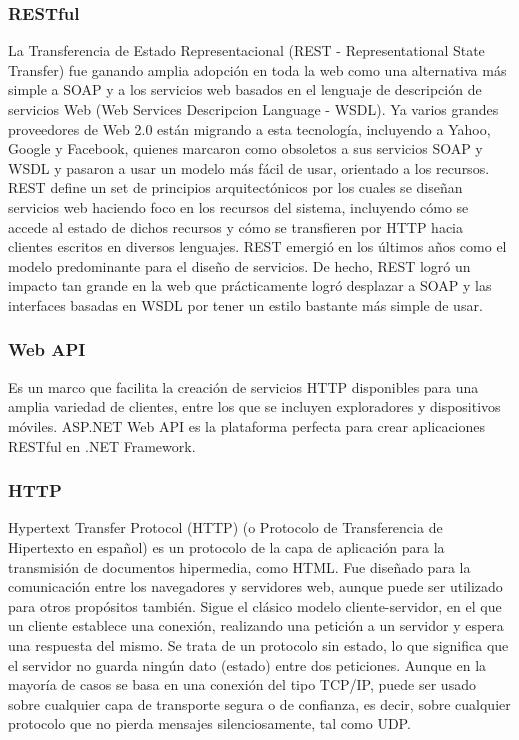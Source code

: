 	
		\subsubsection{RESTful}
		
		{La Transferencia de Estado Representacional (REST - Representational State Transfer) fue ganando amplia adopción en toda la web como una alternativa más simple a SOAP y a los servicios web basados en el lenguaje de descripción de servicios Web (Web Services Descripcion Language - WSDL). Ya varios grandes proveedores de Web 2.0 están migrando a esta tecnología, incluyendo a Yahoo, Google y Facebook, quienes marcaron como obsoletos a sus servicios SOAP y WSDL y pasaron a usar un modelo más fácil de usar, orientado a los recursos.\\
			
		REST define un set de principios arquitectónicos por los cuales se diseñan servicios web haciendo foco en los recursos del sistema, incluyendo cómo se accede al estado de dichos recursos y cómo se transfieren por HTTP hacia clientes escritos en diversos lenguajes. REST emergió en los últimos años como el modelo predominante para el diseño de servicios. De hecho, REST logró un impacto tan grande en la web que prácticamente logró desplazar a SOAP y las interfaces basadas en WSDL por tener un estilo bastante más simple de usar.}
	
	
		\subsubsection{Web API}
		
		{Es un marco que facilita la creación de servicios HTTP disponibles para una amplia variedad de clientes, entre los que se incluyen exploradores y dispositivos móviles. ASP.NET Web API es la plataforma perfecta para crear aplicaciones RESTful en .NET Framework.}
		
		
		\subsubsection{HTTP}
		
		{Hypertext Transfer Protocol (HTTP) (o Protocolo de Transferencia de Hipertexto en español) es un protocolo de la capa de aplicación para la transmisión de documentos hipermedia, como HTML. Fue diseñado para la comunicación entre los navegadores y servidores web, aunque puede ser utilizado para otros propósitos también. Sigue el clásico modelo cliente-servidor, en el que un cliente establece una conexión, realizando una petición a un servidor y espera una respuesta del mismo. Se trata de un protocolo sin estado, lo que significa que el servidor no guarda ningún dato (estado) entre dos peticiones. Aunque en la mayoría de casos se basa en una conexión del tipo TCP/IP, puede ser usado sobre cualquier capa de transporte segura o de confianza, es decir, sobre cualquier protocolo que no pierda mensajes silenciosamente, tal como UDP.}
		
